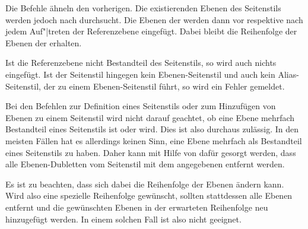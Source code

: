\begin{Declaration}
\end{Declaration}
%
%
\iffalse%
Diese beiden Befehle ähneln den vorangegangenen. Allerdings wird hier
zusätzlich ein \PName{Referenzebenen-Name} angegeben. Die Ebenen des über den
\PName{Seitenstil-Name} angegebenen Seitenstils werden nach dieser
Referenzebene durchsucht. %
\else%
Die Befehle ähneln den vorherigen. Die existierenden Ebenen des Seitenstils
werden jedoch nach  durchsucht. %
\fi%
Die Ebenen der  werden dann
vor
respektive nach jedem Auf"|treten der Referenzebene %
\iffalse%
in die Ebenen des Seitenstils %
\fi%
eingefügt. Dabei bleibt die Reihenfolge der Ebenen der
 erhalten.

Ist die Referenzebene nicht Bestandteil des Seitenstils, so wird auch nichts
eingefügt. Ist der Seitenstil hingegen kein Ebenen-Seitenstil und auch kein
Alias-Seitenstil, der zu einem Ebenen-Seitenstil führt, so wird ein Fehler
gemeldet.%
\EndIndexGroup


\begin{Declaration}
\end{Declaration}
%
%
Bei den Befehlen zur Definition eines Seitenstils oder zum Hinzufügen von
Ebenen zu einem Seitenstil wird nicht darauf geachtet, ob eine Ebene mehrfach
Bestandteil eines Seitenstils ist oder wird. Dies ist also durchaus
zulässig. In den meisten Fällen hat es allerdings keinen Sinn, eine Ebene
mehrfach als Bestandteil eines Seitenstils zu haben. Daher kann mit Hilfe von
 dafür gesorgt werden, dass alle
Ebenen-Dubletten vom Seitenstil mit dem angegebenen 
entfernt werden.

Es ist zu beachten, dass sich dabei die Reihenfolge der
Ebenen ändern kann. Wird also eine spezielle Reihenfolge gewünscht, sollten
stattdessen alle Ebenen entfernt und die gewünschten Ebenen in der erwarteten
Reihenfolge neu hinzugefügt werden. In einem solchen Fall ist
 also nicht geeignet.%
\EndIndexGroup


